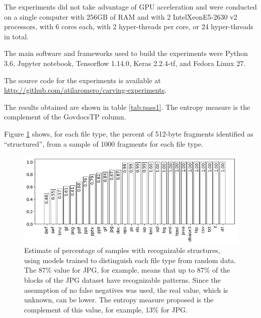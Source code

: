 The experiments did not take advantage of GPU acceleration and were  conducted on a single computer with 256GB of RAM and with 2 Intel\textregistered Xeon\textregistered E5-2630 v2 processors, with 6 cores each, with 2 hyper-threads per core, or 24 hyper-threads in total. 


The main software and frameworks used to build the experiments were Python 3.6, Jupyter notebook, Tensorflow 1.14.0, Keras 2.2.4-tf, and Fedora Linux 27.

The source code for the experiments is available at \sloppy\url{http://github.com/atilaromero/carving-experiments}.




The results obtained are shown in table \ref{tab:pass1}. The entropy measure is the complement of the GovdocsTP column.

Figure \ref{fig:not_random} shows, for each file type, the percent of 512-byte fragments identified as ``structured'', from a sample of 1000 fragments for each file type.

\noindent
\begin{figure}[htb!]
\centering\includegraphics[width=1.0\textwidth]{content/random.png}
\caption[]{\label{fig:not_random}Estimate of percentage of samples with recognizable structures, using models trained to distinguish each file type from random data. The 87\% value for JPG, for example, means that up to 87\% of the blocks of the JPG dataset have recognizable patterns. Since the assumption of no false negatives was used, the real value, which is unknown, can be lower. The entropy measure proposed is the complement of this value, for example, 13\% for JPG.}%
\end{figure}
